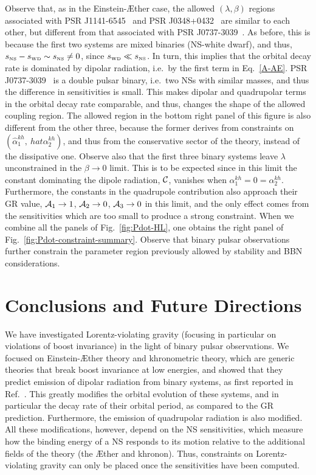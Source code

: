 \documentclass[prd,aps,twocolumn,nofootinbib,showpacs,superscriptaddress]{revtex4-1}
\def\kh{{kh}}
\newcommand{\WD}{{\mbox{\tiny WD}}}
\newcommand{\NSS}{{\mbox{\tiny NS}}}
\begin{document}
Observe that, as in the Einstein-\AE ther case, the allowed $(\lambda,\beta)$ regions associated with PSR J1141-6545~\cite{bhat} and PSR J0348+0432~\cite{2.01NS} are similar to each other, but different from that associated with PSR J0737-3039~\cite{2.01NS}. As before, this is because the first two systems are mixed binaries (NS-white dwarf), and thus, $s_{\NSS} - s_{\WD} \sim s_{\NSS} \neq 0$, since $s_{\WD} \ll s_{\NSS}$. In turn, this implies that the orbital decay rate is dominated by dipolar radiation, i.e.~by the first term in Eq.~\eqref{A-AE}. PSR J0737-3039~\cite{kramer-double-pulsar} is a double pulsar binary, i.e.~two NSs with similar masses, and thus the difference in sensitivities is small. This makes dipolar and quadrupolar terms in the orbital decay rate comparable, and thus, changes the shape of the allowed coupling region. The allowed region in the bottom right panel of this figure is also different from the other three, because the former derives from constraints on $(\hat{\alpha}_{1}^{\kh},\
hat{\alpha}_{2}^{\kh})$, and thus from the conservative sector of the theory, instead of the dissipative one. Observe also that the  first three binary systems leave $\lambda$ unconstrained in the $\beta\to 0$ limit. This is to be expected since in this limit the constant dominating the dipole radiation, $\cal C$, vanishes when $\alpha^{kh}_1= 0 = \alpha^{kh}_2$. Furthermore,  the constants in the quadrupole contribution 
also approach their GR value, ${\cal A}_1\to 1$, ${\cal A}_2\to 0$, ${\cal A}_3\to 0$ in this limit, and the only effect comes from the sensitivities which are too small to produce a strong constraint. When we combine all the panels of Fig.~\ref{fig:Pdot-HL}, one obtains the right panel of Fig.~\ref{fig:Pdot-constraint-summary}. Observe that binary pulsar observations further constrain the parameter region previously allowed by stability and BBN considerations.

\section{Conclusions and Future Directions}
\label{sec:Conclusions}

We have investigated Lorentz-violating gravity (focusing in particular on violations of boost invariance) in the light of binary pulsar observations. 
We focused on Einstein-\AE ther theory and khronometric theory,
which are generic theories that break boost invariance at low energies,
and showed that they predict emission of dipolar radiation from binary systems, as first reported in Ref.~\cite{Foster:2006az,Foster:2007gr,Blas:2011zd}. This 
greatly modifies the orbital evolution of these systems, and in particular the decay rate of their orbital period, as compared to the GR prediction. Furthermore, the emission of quadrupolar radiation is also modified.
All these modifications, however, depend on the NS sensitivities, which measure how the binding energy of 
a NS responds to its motion relative to the additional fields of the theory (the \AE ther and khronon).
Thus, constraints on Lorentz-violating gravity can only be placed once the 
sensitivities have been computed.  
\end{document}
